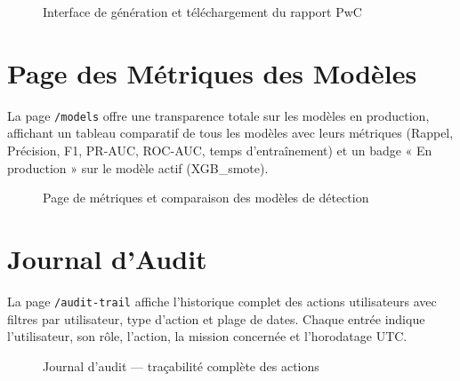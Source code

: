 \documentclass[12pt,a4paper,twoside]{report}
\theoremstyle{definition}
\begin{document}
\begin{figure}[H]
\centering
{}
\caption{Interface de génération et téléchargement du rapport PwC}
\label{fig:ui_report}
\end{figure}

\section{Page des Métriques des Modèles}

La page \texttt{/models} offre une transparence totale sur les modèles en
production, affichant un tableau comparatif de tous les modèles avec leurs
métriques (Rappel, Précision, F1, PR-AUC, ROC-AUC, temps d'entraînement)
et un badge « En production » sur le modèle actif (XGB\_smote).

\begin{figure}[H]
\centering
{}
\caption{Page de métriques et comparaison des modèles de détection}
\label{fig:ui_models}
\end{figure}

\section{Journal d'Audit}

La page \texttt{/audit-trail} affiche l'historique complet des actions utilisateurs
avec filtres par utilisateur, type d'action et plage de dates. Chaque entrée
indique l'utilisateur, son rôle, l'action, la mission concernée et l'horodatage UTC.

\begin{figure}[H]
\centering
{}
\caption{Journal d'audit --- traçabilité complète des actions}
\label{fig:ui_audit}
\end{figure}
\end{document}
